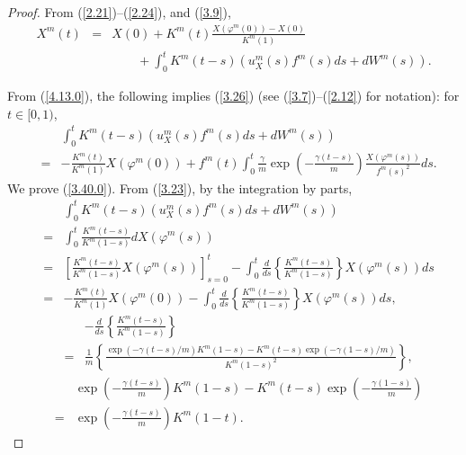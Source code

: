 \documentclass[12pt]{article}
\begin{document}
\begin{proof}

From (\ref{2.21})--(\ref{2.24}), and (\ref{3.9}), 
\begin{eqnarray}
X^m(t)&=&X(0)+K^m(t)\frac{X(\varphi^m(0))-X(0)}{K^m(1)}\label{4.13.0}\\
&&\qquad +\int_{0}^{t} K^m(t-s)(u_X^m(s)f^m(s)ds +d W^m(s)).\nonumber
\end{eqnarray}

From (\ref{4.13.0}),
 the following implies (\ref{3.26}) (see (\ref{3.7})--(\ref{2.12})
for notation): for $t\in [0,1)$,
\begin{eqnarray}\label{3.40.0}
&&\int_{0}^{t} K^m(t-s)(u_X^m(s)f^m(s)ds +d W^m(s))\\
&=&-\frac{K^m(t)}{K^m(1)}X(\varphi^m(0))
+f^m(t)\int_{0}^{t}
\frac{\gamma}{m}\exp\left(-\frac{\gamma (t-s)}{m}\right)\frac{X(\varphi^m(s))}{f^m(s)^2}ds.\nonumber
 \end{eqnarray}
We prove (\ref{3.40.0}).  
 From (\ref{3.23}), by the integration by parts,
\begin{eqnarray}
&&\int_{0}^{t} K^m(t-s)(u_X^m(s)f^m(s)ds +d W^m(s))\label{4.15.0}\\
&=&\int_{0}^{t} \frac{K^m(t-s)}{K^m(1-s)}dX(\varphi^m(s))\nonumber\\
 &=&\left[\frac{K^m(t-s)}{K^m(1-s)}X(\varphi^m(s))\right]_{s=0}^t
 -\int_{0}^{t} \frac{d}{ds}\left\{\frac{K^m(t-s)}{K^m(1-s)}\right\}X(\varphi^m(s))ds\nonumber\\
 &=&-\frac{K^m(t)}{K^m(1)}X(\varphi^m(0))
 -\int_{0}^{t} \frac{d}{ds}\left\{\frac{K^m(t-s)}{K^m(1-s)}\right\}X(\varphi^m(s))ds,\nonumber
 \end{eqnarray}
 \begin{eqnarray}\label{3.39}
&& -\frac{d}{ds}\left\{\frac{K^m(t-s)}{K^m(1-s)}\right\}\\
&=&\frac{1}{m}\left\{\frac{\exp(-\gamma (t-s)/m)K^m(1-s)-K^m(t-s)\exp(-\gamma (1-s)/m)}{K^m(1-s)^2}\right\},\nonumber
\end{eqnarray}
\begin{eqnarray}\label{3.40}
&&\exp\left(-\frac{\gamma (t-s)}{m}\right)K^m(1-s)-K^m(t-s)\exp\left(-\frac{\gamma (1-s)}{m}\right)\\
&=&\exp\left(-\frac{\gamma (t-s)}{m}\right)K^m(1-t).\nonumber
\end{eqnarray}


\end{proof}
\end{document}
